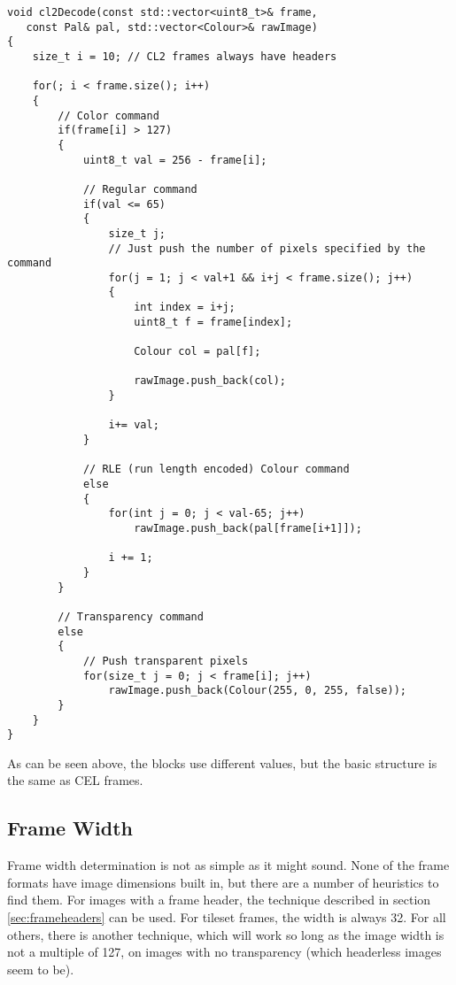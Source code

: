    \begin{lstlisting}
void cl2Decode(const std::vector<uint8_t>& frame, 
   const Pal& pal, std::vector<Colour>& rawImage)
{
    size_t i = 10; // CL2 frames always have headers

    for(; i < frame.size(); i++)
    {
        // Color command
        if(frame[i] > 127)
        {
            uint8_t val = 256 - frame[i];
           
            // Regular command
            if(val <= 65)
            {
                size_t j;
                // Just push the number of pixels specified by the command
                for(j = 1; j < val+1 && i+j < frame.size(); j++)
                {
                    int index = i+j;
                    uint8_t f = frame[index];

                    Colour col = pal[f];

                    rawImage.push_back(col);
                }
              
                i+= val;
            }

            // RLE (run length encoded) Colour command
            else
            {
                for(int j = 0; j < val-65; j++)
                    rawImage.push_back(pal[frame[i+1]]);
          
                i += 1;
            }
        }
        
        // Transparency command
        else
        {
            // Push transparent pixels
            for(size_t j = 0; j < frame[i]; j++)
                rawImage.push_back(Colour(255, 0, 255, false));
        }
    }
}
   \end{lstlisting}
   
   As can be seen above, the blocks use different values, but the basic structure is the same as CEL frames.
   
 	\subsection{Frame Width}
 	Frame width determination is not as simple as it might sound. None of the frame formats have image dimensions built in, but there are a number of heuristics to find them.
 	For images with a frame header, the technique described in section \ref{sec:frameheaders} can be used. 
 	For tileset frames, the width is always 32.
 	For all others, there is another technique, which will work so long as the image width is not a multiple of 127, on images with no transparency (which headerless images seem to be).
 	
